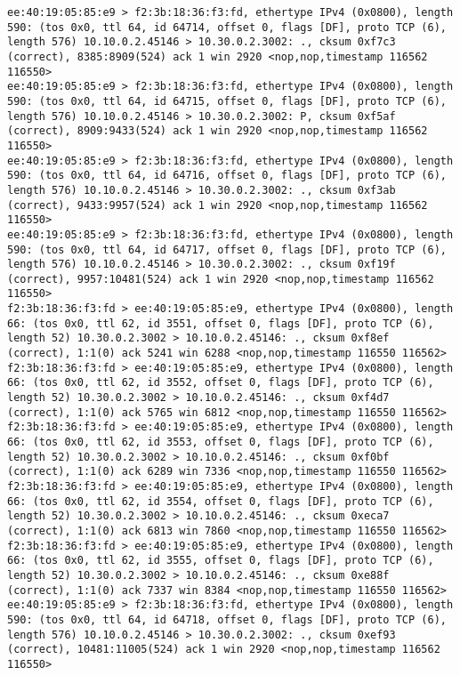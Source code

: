 \documentclass[a4paper,12pt]{article}
\begin{document}
\begin{Verbatim}
ee:40:19:05:85:e9 > f2:3b:18:36:f3:fd, ethertype IPv4 (0x0800), length 590: (tos 0x0, ttl 64, id 64714, offset 0, flags [DF], proto TCP (6), length 576) 10.10.0.2.45146 > 10.30.0.2.3002: ., cksum 0xf7c3 (correct), 8385:8909(524) ack 1 win 2920 <nop,nop,timestamp 116562 116550>
ee:40:19:05:85:e9 > f2:3b:18:36:f3:fd, ethertype IPv4 (0x0800), length 590: (tos 0x0, ttl 64, id 64715, offset 0, flags [DF], proto TCP (6), length 576) 10.10.0.2.45146 > 10.30.0.2.3002: P, cksum 0xf5af (correct), 8909:9433(524) ack 1 win 2920 <nop,nop,timestamp 116562 116550>
ee:40:19:05:85:e9 > f2:3b:18:36:f3:fd, ethertype IPv4 (0x0800), length 590: (tos 0x0, ttl 64, id 64716, offset 0, flags [DF], proto TCP (6), length 576) 10.10.0.2.45146 > 10.30.0.2.3002: ., cksum 0xf3ab (correct), 9433:9957(524) ack 1 win 2920 <nop,nop,timestamp 116562 116550>
ee:40:19:05:85:e9 > f2:3b:18:36:f3:fd, ethertype IPv4 (0x0800), length 590: (tos 0x0, ttl 64, id 64717, offset 0, flags [DF], proto TCP (6), length 576) 10.10.0.2.45146 > 10.30.0.2.3002: ., cksum 0xf19f (correct), 9957:10481(524) ack 1 win 2920 <nop,nop,timestamp 116562 116550>
f2:3b:18:36:f3:fd > ee:40:19:05:85:e9, ethertype IPv4 (0x0800), length 66: (tos 0x0, ttl 62, id 3551, offset 0, flags [DF], proto TCP (6), length 52) 10.30.0.2.3002 > 10.10.0.2.45146: ., cksum 0xf8ef (correct), 1:1(0) ack 5241 win 6288 <nop,nop,timestamp 116550 116562>
f2:3b:18:36:f3:fd > ee:40:19:05:85:e9, ethertype IPv4 (0x0800), length 66: (tos 0x0, ttl 62, id 3552, offset 0, flags [DF], proto TCP (6), length 52) 10.30.0.2.3002 > 10.10.0.2.45146: ., cksum 0xf4d7 (correct), 1:1(0) ack 5765 win 6812 <nop,nop,timestamp 116550 116562>
f2:3b:18:36:f3:fd > ee:40:19:05:85:e9, ethertype IPv4 (0x0800), length 66: (tos 0x0, ttl 62, id 3553, offset 0, flags [DF], proto TCP (6), length 52) 10.30.0.2.3002 > 10.10.0.2.45146: ., cksum 0xf0bf (correct), 1:1(0) ack 6289 win 7336 <nop,nop,timestamp 116550 116562>
f2:3b:18:36:f3:fd > ee:40:19:05:85:e9, ethertype IPv4 (0x0800), length 66: (tos 0x0, ttl 62, id 3554, offset 0, flags [DF], proto TCP (6), length 52) 10.30.0.2.3002 > 10.10.0.2.45146: ., cksum 0xeca7 (correct), 1:1(0) ack 6813 win 7860 <nop,nop,timestamp 116550 116562>
f2:3b:18:36:f3:fd > ee:40:19:05:85:e9, ethertype IPv4 (0x0800), length 66: (tos 0x0, ttl 62, id 3555, offset 0, flags [DF], proto TCP (6), length 52) 10.30.0.2.3002 > 10.10.0.2.45146: ., cksum 0xe88f (correct), 1:1(0) ack 7337 win 8384 <nop,nop,timestamp 116550 116562>
ee:40:19:05:85:e9 > f2:3b:18:36:f3:fd, ethertype IPv4 (0x0800), length 590: (tos 0x0, ttl 64, id 64718, offset 0, flags [DF], proto TCP (6), length 576) 10.10.0.2.45146 > 10.30.0.2.3002: ., cksum 0xef93 (correct), 10481:11005(524) ack 1 win 2920 <nop,nop,timestamp 116562 116550>

\end{Verbatim}
\end{document}
